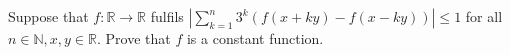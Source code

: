 Suppose that $f: \mathbb{R}\rightarrow\mathbb{R}$ fulfils $\left|\sum^n_{k=1}3^k\left(f(x+ky)-f(x-ky)\right)\right|\le1$ for all $n\in\mathbb{N},x,y\in\mathbb{R}$. Prove that $f$ is a constant function.
